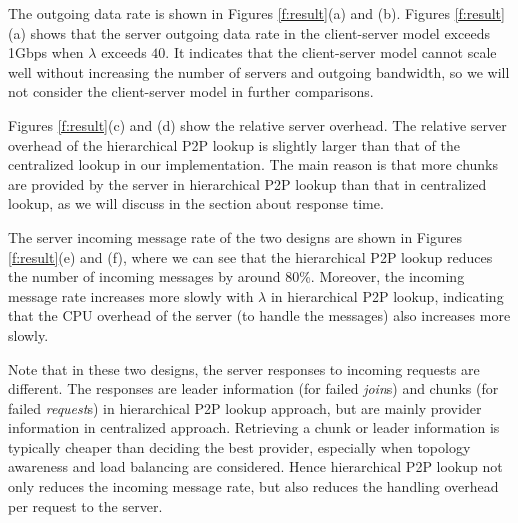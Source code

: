     The outgoing data rate is shown in  Figures \ref{f:result}(a) and
    (b).
    Figures \ref{f:result}(a) shows that the server outgoing data rate 
    in the client-server model exceeds 1Gbps when $\lambda$ exceeds $40$. 
    It indicates that the client-server model cannot scale well
    without increasing the number of servers and outgoing bandwidth,
    so we will not consider the client-server model in further
    comparisons.
    
    Figures \ref{f:result}(c) and (d) show the relative server
    overhead.
    The relative server overhead of the hierarchical P2P lookup is
    slightly larger than that of the centralized lookup in our
    implementation. The main reason is that more chunks are provided
    by the server in hierarchical P2P lookup than that in centralized
    lookup, as we will discuss in the section about response time.%

    The server incoming message rate of the two designs are shown in
    Figures \ref{f:result}(e) and (f), where we can see that 
    the hierarchical P2P lookup reduces the number of incoming
    messages by around
    80\%. Moreover, the incoming message rate increases more slowly with
    $\lambda$ in hierarchical P2P lookup, indicating that 
    the CPU overhead of the server (to handle the messages) also 
	increases more slowly.

    Note that in these two designs, the server responses to incoming
    requests are different. The responses are leader
    information (for failed \emph{join}s) and chunks (for failed
    \emph{request}s) in hierarchical P2P lookup approach, but are
    mainly provider information in centralized approach. 
    Retrieving a chunk or leader information is typically
    cheaper than deciding the best provider, especially when
    topology awareness and load balancing are considered. Hence 
    hierarchical P2P lookup not only reduces the incoming message rate, but
    also reduces the handling overhead per request to the server.
    
